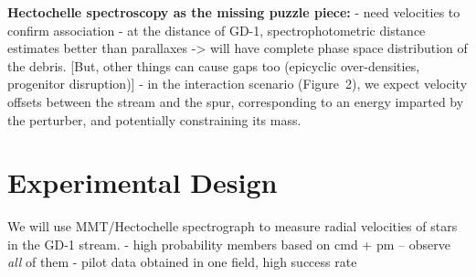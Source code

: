 \documentclass[12pt]{article}
\begin{document}
{\bf Hectochelle spectroscopy as the missing puzzle piece:}
- need velocities to confirm association
- at the distance of GD-1, spectrophotometric distance estimates better than parallaxes -> will have complete phase space distribution of the debris.
[But, other things can cause gaps too (epicyclic over-densities, progenitor disruption)]
- in the interaction scenario (Figure~2), we expect velocity offsets between the stream and the spur, corresponding to an energy imparted by the perturber, and potentially constraining its mass.


\pagebreak
\section*{Experimental Design}\vskip-0.2in


We will use MMT/Hectochelle spectrograph to measure radial velocities of stars in the GD-1 stream.
- high probability members based on cmd + pm -- observe \emph{all} of them
- pilot data obtained in one field, high success rate
\end{document}
